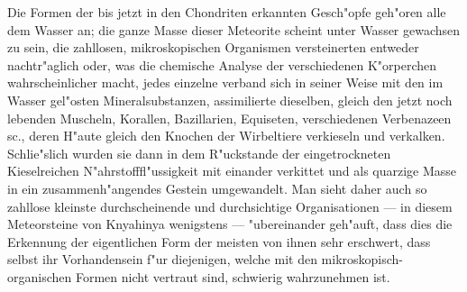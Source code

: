 \documentclass[a4paper, 11pt, oneside]{article}
\begin{document}
Die Formen der bis jetzt in den Chondriten erkannten Gesch"opfe geh"oren alle dem Wasser an; die ganze Masse dieser Meteorite scheint unter Wasser gewachsen zu sein, die zahllosen, mikroskopischen Organismen versteinerten entweder nachtr"aglich oder, was die chemische Analyse der verschiedenen K"orperchen wahrscheinlicher macht, jedes einzelne verband sich in seiner Weise mit den im Wasser gel"osten Mineralsubstanzen, assimilierte dieselben, gleich den jetzt noch lebenden Muscheln, Korallen, Bazillarien, Equiseten, verschiedenen Verbenazeen sc., deren H"aute gleich den Knochen der Wirbeltiere verkieseln und verkalken. Schlie"slich wurden sie dann in dem R"uckstande der eingetrockneten Kieselreichen N"ahrstofffl"ussigkeit mit einander verkittet und als quarzige Masse in ein zusammenh"angendes Gestein umgewandelt. Man sieht daher auch so zahllose kleinste durchscheinende und durchsichtige Organisationen --- in diesem Meteorsteine von Knyahinya wenigstens --- "ubereinander geh"auft, dass dies die Erkennung der eigentlichen Form der meisten von ihnen sehr erschwert, dass selbst ihr Vorhandensein f"ur diejenigen, welche mit den mikroskopisch-organischen Formen nicht vertraut sind, schwierig wahrzunehmen ist.
\end{document}
